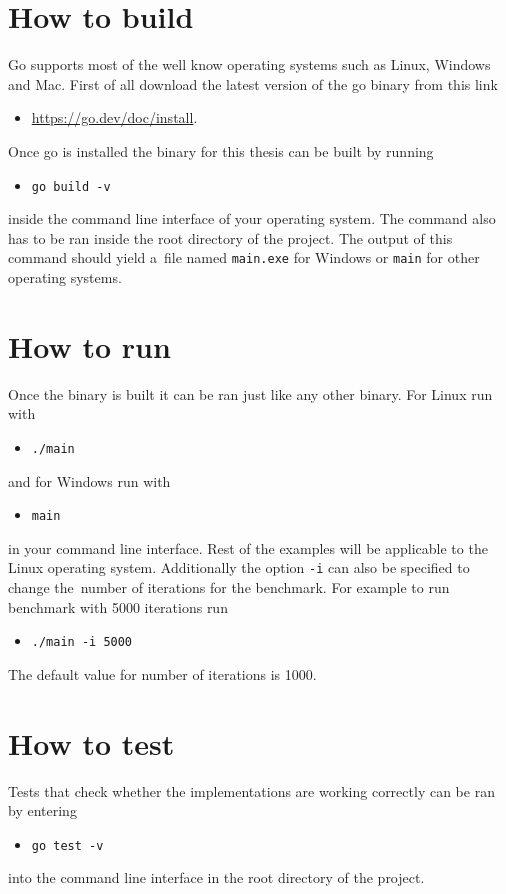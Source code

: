 \section{How to build}
Go supports most of the well know operating systems such as Linux, Windows and Mac. First of all download the latest version of the go binary from this link
\begin{itemize}
  \item \url{https://go.dev/doc/install}.
\end{itemize}
Once go is installed the binary for this thesis can be built by running
\begin{itemize}
  \item \texttt{go build -v}
\end{itemize}
inside the command line interface of your operating system. The command also has to be ran inside the root directory of the project. The output of this command should yield a~file named \texttt{main.exe} for Windows or \texttt{main} for other operating systems.
\section{How to run}
Once the binary is built it can be ran just like any other binary. For Linux run with
\begin{itemize}
  \item \texttt{./main}
\end{itemize}
and for Windows run with
\begin{itemize}
  \item \texttt{main}
\end{itemize}
in your command line interface. Rest of the examples will be applicable to the Linux operating system. Additionally the option \texttt{-i} can also be specified to change the~number of iterations for the benchmark. For example to run benchmark with 5000 iterations run
\begin{itemize}
  \item \texttt{./main -i 5000}
\end{itemize}
The default value for number of iterations is 1000.
\section{How to test}
Tests that check whether the implementations are working correctly can be ran by entering
\begin{itemize}
  \item \texttt{go test -v}
\end{itemize}
into the command line interface in the root directory of the project.
